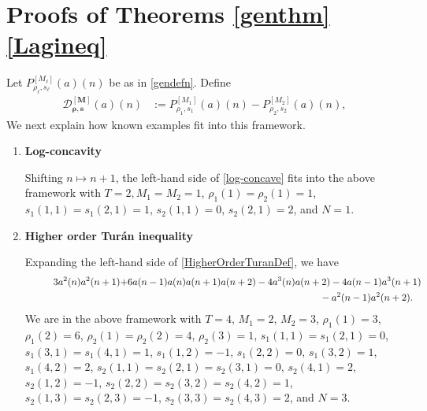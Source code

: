 \documentclass[11pt,reqno,a4paper]{amsart}
\renewcommand{\(}{\left\(}
\renewcommand{\)}{\right\)}
\numberwithin{equation}{section}
\theoremstyle{plain}
\theoremstyle{definition} %
\numberwithin{equation}{section}
\begin{document}
\section{Proofs of Theorems \ref{genthm}\textendash\ref{Lagineq}}\label{secgen}
 
Let $P^{[M_{\ell}]}_{\rho_{\ell},s_{\ell}}(a)(n)$ be as in \eqref{gendefn}. Define
\begin{align}\label{gendefn1}%
\mathcal{D}^{[\bm{M}]}_{\bm{\rho},\bm{s}}(a)(n)%
&:=P^{[M_1]}_{\rho_1,s_1}(a)(n)-P^{[M_2]}_{\rho_2,s_2}(a)(n),
\end{align}
We next explain how known examples fit into this framework. 
\begin{enumerate}[
	label=(E\arabic*),
	wide,
	labelwidth=!,
	labelindent=0pt
	]

\item {\bf Log-concavity}

\noindent \label{LC}  Shifting $n\mapsto n+1$, 
the left-hand side of \eqref{log-concave} fits into the above framework with $T=2, M_1=M_2=1$, $\rho_1(1)=\rho_2(1)=1$, $s_1(1,1)=
s_1(2,1)=1$, $s_2(1,1)=0$, $s_2(2,1)=2$, and $N=1$.  %
\vspace{0.2 cm}
 
\item {\bf Higher order Tur\'{a}n inequality}  

\noindent \label{HT} Expanding the left-hand side of \eqref{HigherOrderTuranDef}, we have
\begin{align*}
\hspace{1 cm}3a^2(n)a^2(n+1)+&6a(n-1)a(n)a(n+1)a(n+2)-4a^3(n)a(n+2)-4a(n-1)a^3(n+1)\\
&\hspace{7 cm}-a^2(n-1)a^2(n+2).%
\end{align*}
We are in the above framework with $T=4$, $M_1=2$, $M_2=3$, $\rho_1(1)=3$, $\rho_1(2)=6$, $\rho_2(1)=\rho_2(2)=4$, $\rho_2(3)=1$, $s_1(1,1)=s_1(2,1)=0$, $s_1(3,1)=s_1(4,1)=1$, $s_1(1,2)=-1$,  $s_1(2,2)=0$, $s_1(3,2)=1$, $s_1(4,2)=2$, $s_2(1,1)=s_2(2,1)=s_2(3,1)=0$, $s_2(4,1)=2$, $s_2(1,2)=-1$, $s_2(2,2)=s_2(3,2)=s_2(4,2)=1$, $s_2(1,3)=s_2(2,3)=-1$, $s_2(3,3)=s_2(4,3)=2$, and $N=3$. %

\vspace{0.2 cm}


\end{enumerate}
\end{document}

